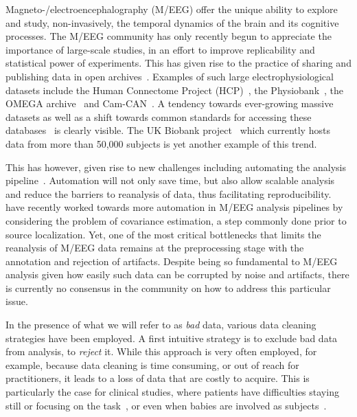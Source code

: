 Magneto-/electroencephalography (M/EEG) offer the unique ability to explore
and study, non-invasively, the temporal dynamics of the brain and its cognitive processes. The M/EEG community has only recently begun to appreciate the importance of large-scale studies, in an effort to improve replicability and statistical power of experiments. This has given rise to the practice of sharing and publishing data in open archives~\citep{gorgolewski2016practical}. Examples of such large electrophysiological datasets include the Human Connectome Project (HCP)~\citep{van2012human, larson2013adding}, the Physiobank~\citep{goldberger2000physiobank}, the OMEGA archive~\citep{niso2016omega} and Cam-CAN~\citep{taylor2015cambridge}. A tendency towards ever-growing massive datasets as well as a shift towards common standards for accessing these databases~\citep{gorgolewski2016brain,bigdely2013hierarchical} is clearly visible. The UK Biobank project~\citep{ollier2005uk} which currently hosts data from more than 50,000 subjects is yet another example of this trend.

This has however, given rise to new challenges including automating the analysis pipeline~\citep{gorgolewski2016practical}. Automation will not only save time, but also allow scalable analysis and reduce the barriers to reanalysis of data, thus facilitating reproducibility. \citet{engemann2015automated_new} have recently worked towards more automation in M/EEG analysis pipelines by considering the problem of covariance estimation, a step commonly done prior to source localization. Yet, one of the most critical bottlenecks that limits the reanalysis of M/EEG data remains at the preprocessing stage with the annotation and rejection of artifacts. Despite being so fundamental to M/EEG analysis given how easily such data can be corrupted by noise and artifacts, there is currently no consensus in the community on how to address this particular issue.

In the presence of what we will refer to as \emph{bad} data, various data cleaning strategies have been employed. A first intuitive strategy is to exclude bad data from analysis, to \emph{reject} it. While this approach is very often employed, for example, because data cleaning is time consuming, or out
of reach for practitioners, it leads to a loss of data that are costly to acquire. This is particularly the case for clinical studies, where patients have difficulties staying still or focusing on the task~\citep{cruse2012bedside,goldfine2013reanalysis}, or even when babies are involved as subjects~\citep{basirat2014hierarchy}.

